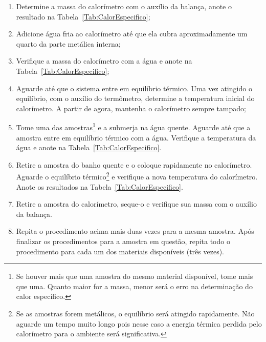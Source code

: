 \begin{enumerate}
	\item Determine a massa do calorímetro com o auxílio da balança, anote o resultado na Tabela~\ref{Tab:CalorEspecifico};
	\item Adicione água fria ao calorímetro até que ela cubra aproximadamente um quarto da parte metálica interna;
	\item Verifique a massa do calorímetro com a água e anote na Tabela~\ref{Tab:CalorEspecifico};
	\item Aguarde até que o sistema entre em equilíbrio térmico. Uma vez atingido o equilíbrio, com o auxílio do termômetro, determine a temperatura inicial do calorímetro. A partir de agora, mantenha o calorímetro sempre tampado;
	\item Tome uma das amostras\footnote{Se houver mais que uma amostra do mesmo material disponível, tome mais que uma. Quanto maior for a massa, menor será o erro na determinação do calor específico.} e a submerja na água quente. Aguarde até que a amostra entre em equilíbrio térmico com a água. Verifique a temperatura da água e anote na Tabela~\ref{Tab:CalorEspecifico}.
	\item Retire a amostra do banho quente e o coloque rapidamente no calorímetro. Aguarde o equilíbrio térmico\footnote{Se as amostras forem metálicos, o equilíbrio será atingido rapidamente. Não aguarde um tempo muito longo pois nesse caso a energia térmica perdida pelo calorímetro para o ambiente será significativa.} e verifique a nova temperatura do calorímetro. Anote os resultados na Tabela~\ref{Tab:CalorEspecifico}.
	\item Retire a amostra do calorímetro, seque-o e verifique sua massa com o auxílio da balança.
	\item Repita o procedimento acima mais duas vezes para a mesma amostra. Após finalizar os procedimentos para a amostra em questão, repita todo o procedimento para cada um dos materiais disponíveis (três vezes).
\end{enumerate}

\cleardoublepage


